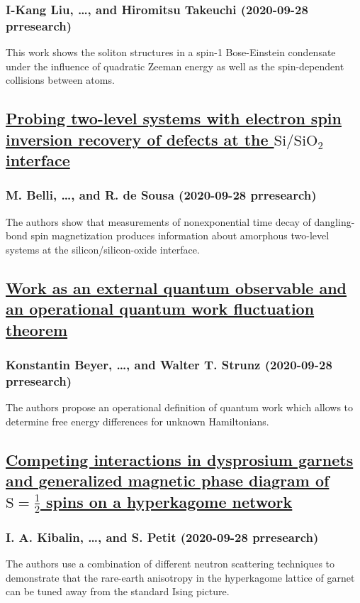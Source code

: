 \subsubsection*{I-Kang Liu, \dots, and Hiromitsu Takeuchi (2020-09-28 prresearch)}
This work shows the soliton structures in a spin-1 Bose-Einstein condensate under the influence of quadratic Zeeman energy as well as the spin-dependent collisions between atoms.
\subsection*{\href{http://link.aps.org/doi/10.1103/PhysRevResearch.2.033507}{Probing two-level systems with electron spin inversion recovery of defects at the $\mathrm{Si}/{\mathrm{SiO}}_{2}$ interface}}
\subsubsection*{M. Belli, \dots, and R. de Sousa (2020-09-28 prresearch)}
The authors show that measurements of nonexponential time decay of dangling-bond spin magnetization produces information about amorphous two-level systems at the silicon/silicon-oxide interface.
\subsection*{\href{http://link.aps.org/doi/10.1103/PhysRevResearch.2.033508}{Work as an external quantum observable and an operational quantum work fluctuation theorem}}
\subsubsection*{Konstantin Beyer, \dots, and Walter T. Strunz (2020-09-28 prresearch)}
The authors propose an operational definition of quantum work which allows to determine free energy differences for unknown Hamiltonians.
\subsection*{\href{http://link.aps.org/doi/10.1103/PhysRevResearch.2.033509}{Competing interactions in dysprosium garnets and generalized magnetic phase diagram of $\mathrm{S}=\frac{1}{2}$ spins on a hyperkagome network}}
\subsubsection*{I. A. Kibalin, \dots, and S. Petit (2020-09-28 prresearch)}
The authors use a combination of different neutron scattering techniques to demonstrate that the rare-earth anisotropy in the hyperkagome lattice of garnet can be tuned away from the standard Ising picture.
